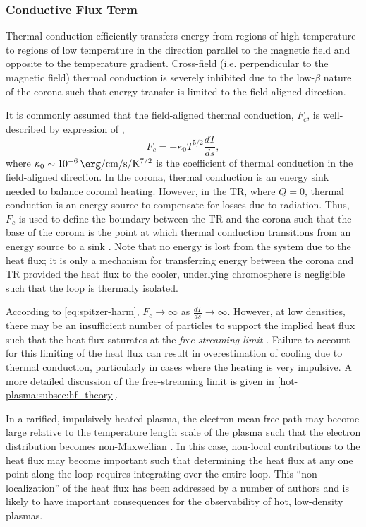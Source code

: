 \subsubsection{Conductive Flux Term}\label{sec:heat-flux}

Thermal conduction efficiently transfers energy from regions of high temperature to regions of low temperature in the direction parallel to the magnetic field and opposite to the temperature gradient. Cross-field (i.e. perpendicular to the magnetic field) thermal conduction is severely inhibited due to the low-$\beta$ nature of the corona such that energy transfer is limited to the field-aligned direction. 

It is commonly assumed that the field-aligned thermal conduction, $F_c$, is well-described by expression of \citet{spitzer_transport_1953},
\begin{equation}\label{eq:spitzer-harm}
    F_c = -\kappa_0 T^{5/2} \frac{dT}{ds},
\end{equation}
where $\kappa_0\sim\SI{e-6}{\erg\per\cm\per\second\per\kelvin\tothe{7/2}}$ is the coefficient of thermal conduction in the field-aligned direction. In the corona, thermal conduction is an energy sink needed to balance coronal heating. However, in the TR, where $Q=0$, thermal conduction is an energy source to compensate for losses due to radiation. Thus, $F_c$ is used to define the boundary between the TR and the corona such that the base of the corona is the point at which thermal conduction transitions from an energy source to a sink \citep{vesecky_numerical_1979,bradshaw_new_2010}. Note that no energy is lost from the system due to the heat flux; it is only a mechanism for transferring energy between the corona and TR provided the heat flux to the cooler, underlying chromosphere is negligible such that the loop is thermally isolated.  

According to \autoref{eq:spitzer-harm}, $F_c\to\infty$ as $\frac{dT}{ds}\to\infty$. However, at low densities, there may be an insufficient number of particles to support the implied heat flux such that the heat flux saturates at the \textit{free-streaming limit} \citep{patsourakos_coronal_2005,bradshaw_explosive_2006,bradshaw_collisional_2013}. Failure to account for this limiting of the heat flux can result in overestimation of cooling due to thermal conduction, particularly in cases where the heating is very impulsive. A more detailed discussion of the free-streaming limit is given in \autoref{hot-plasma:subsec:hf_theory}.

In a rarified, impulsively-heated plasma, the electron mean free path may become large relative to the temperature length scale of the plasma such that the electron distribution becomes non-Maxwellian \citep{bradshaw_collisional_2013}. In this case, non-local contributions to the heat flux may become important such that determining the heat flux at any one point along the loop requires integrating over the entire loop. This ``non-localization'' of the heat flux has been addressed by a number of authors \citep{ljepojevic_heat_1989,karpen_nonlocal_1987,luciani_nonlocal_1983,west_lifetime_2008} and is likely to have important consequences for the observability of hot, low-density plasmas.

